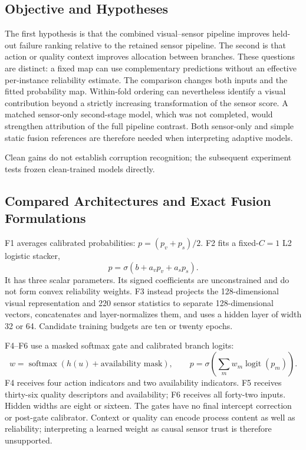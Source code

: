 \subsection{Objective and Hypotheses}
The first hypothesis is that the combined visual--sensor pipeline improves held-out
failure ranking relative to the retained sensor pipeline. The second is that action or
quality context improves allocation between branches. These questions are distinct: a
fixed map can use complementary predictions without an effective per-instance
reliability estimate. The comparison changes both inputs and the fitted probability map.
Within-fold ordering can nevertheless identify a visual contribution beyond a strictly
increasing transformation of the sensor score. A matched sensor-only second-stage model,
which was not completed, would strengthen attribution of the full pipeline contrast.
Both sensor-only and simple static fusion references are therefore needed when
interpreting adaptive models.

Clean gains do not establish corruption recognition; the subsequent experiment tests
frozen clean-trained models directly.

\subsection{Compared Architectures and Exact Fusion Formulations}
F1 averages calibrated probabilities: $p=(p_v+p_s)/2$. F2 fits a fixed-$C=1$ L2 logistic stacker,
\begin{equation}p=\sigma(b+a_vp_v+a_sp_s).\end{equation}
It has three scalar parameters. Its signed coefficients are unconstrained and do not
form convex reliability weights. F3 instead projects the 128-dimensional visual
representation and 220 sensor statistics to separate 128-dimensional vectors,
concatenates and layer-normalizes them, and uses a hidden layer of width 32 or 64.
Candidate training budgets are ten or twenty epochs.

F4--F6 use a masked softmax gate and calibrated branch logits:
\begin{equation}w=\operatorname{softmax}(h(u)+\text{availability mask}),\qquad
p=\sigma\!\left(\sum_m w_m\operatorname{logit}(p_m)\right).\end{equation}
F4 receives four action indicators and two availability indicators. F5 receives
thirty-six quality descriptors and availability; F6 receives all forty-two inputs.
Hidden widths are eight or sixteen. The gates have no final intercept correction or
post-gate calibrator. Context or quality can encode process content as well as
reliability; interpreting a learned weight as causal sensor trust is therefore
unsupported.

